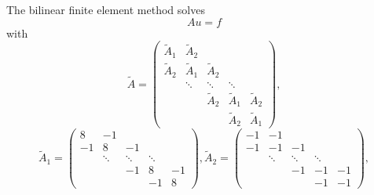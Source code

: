 \begin{enumerate}
The bilinear finite element method solves
\begin{equation}
\label{laplace-h}
Au=f
\end{equation}
with
\begin{equation}\label{uniformbilinear-laplace}
\tilde A=
\begin{pmatrix}
\tilde A_1&\tilde A_2&\\
\tilde A_2&\tilde A_1&\tilde A_2&\\
     &\ddots&\ddots&\ddots&\\
     &     &\tilde A_2&\tilde A_1&\tilde A_2\\
     &     &     &\tilde A_2&\tilde A_1
\end{pmatrix},
\end{equation}
\begin{equation*}
\tilde A_1=
\begin{pmatrix}
8&-1&\\
-1&8&-1&\\
     &\ddots&\ddots&\ddots&\\
     &     &-1&8&-1\\
     &     &     &-1&8
\end{pmatrix},
\tilde A_2=
\begin{pmatrix}
-1&-1&\\
-1&-1&-1&\\
     &\ddots&\ddots&\ddots&\\
     &     &-1&-1&-1\\
     &     &     &-1&-1
\end{pmatrix},
\end{equation*}
\end{enumerate}


